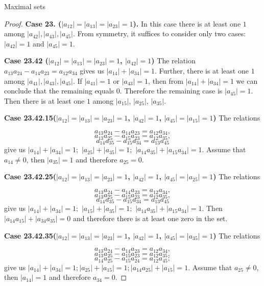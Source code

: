 \documentclass[12pt]{article}
\begin{document}
\begin{section}{Maximal sets}
\begin{proof}
        \textbf{Case 23. ($|a_{12}|=|a_{13}|=|a_{23}|=1$).} In this case there is at least one $1$ among $|a_{42}|, |a_{43}|,|a_{45}|$. From symmetry, it suffices to consider only two cases: $|a_{42}|=1$ and $|a_{45}|=1.$
    
        \textbf{Case 23.42 ($|a_{12}|=|a_{13}|=|a_{23}|=1$, $|a_{42}|=1$)} The relation  $a_{13}a_{24} - a_{14}a_{23} = a_{12}a_{34}$  gives us  $|a_{14}| + |a_{34}|=1.$ Further, there is at least one $1$ among $|a_{41}|,|a_{43}|, |a_{45}|$. If $|a_{41}|=1$ or $|a_{43}|=1$, then from $|a_{14}| + |a_{34}|=1$ we can conclude that the remaining equals $0$. Therefore the remaining case is $|a_{45}|=1.$ Then there is at least one $1$ among $|a_{15}|$, $|a_{25}|$, $|a_{35}|$.
    
         \textbf{Case 23.42.15($|a_{12}|=|a_{13}|=|a_{23}|=1$, $|a_{42}|=1$, $|a_{45}|=|a_{15}|=1$)} The relations 
         
         $$
            a_{13}a_{24} - a_{14}a_{23} = a_{12}a_{34},
         $$
           $$
            a_{13}a_{25} - a_{15}a_{23} = a_{12}a_{35},
         $$
         $$
            a_{14}a_{35} - a_{15}a_{34} = a_{13}a_{45}
         $$
         give us $|a_{14}| + |a_{34}| = 1;$ $|a_{25}| + |a_{35}| = 1;$ $|a_{14}a_{35}| + |a_{15}a_{34}| = 1$. Assume that $a_{14}\neq 0$, then $|a_{35}|=1$ and therefore $a_{25}=0.$
         
         
         \textbf{Case 23.42.25($|a_{12}|=|a_{13}|=|a_{23}|=1$, $|a_{42}|=1$, $|a_{45}|=|a_{25}|=1$)} The relations 
         
         $$
            a_{13}a_{24} - a_{14}a_{23} = a_{12}a_{34},
         $$
           $$
            a_{13}a_{25} - a_{15}a_{23} = a_{12}a_{35},
         $$
         $$
            a_{14}a_{35} - a_{15}a_{34} = a_{13}a_{45}
         $$
         give us $|a_{14}| + |a_{34}| = 1;$ $|a_{15}| + |a_{35}| = 1;$ $|a_{14}a_{35}| + |a_{15}a_{34}| = 1$. Then $|a_{14}a_{15}| + |a_{34}a_{35}|=0$ and therefore there is at least one zero in the set.
         
         \textbf{Case 23.42.35($|a_{12}|=|a_{13}|=|a_{23}|=1$, $|a_{42}|=1$, $|a_{45}|=|a_{35}|=1$)} 
     The relations 
         
         $$
            a_{13}a_{24} - a_{14}a_{23} = a_{12}a_{34},
         $$
           $$
            a_{13}a_{25} - a_{15}a_{23} = a_{12}a_{35},
         $$
       $$
            a_{14}a_{25} - a_{15}a_{24} = a_{12}a_{45};
        $$
         give us $|a_{14}|+|a_{34}|=1; |a_{25}| + |a_{15}|=1; |a_{14}a_{25}| + |a_{15}|=1.$ Assume that $a_{25}\neq 0$, then $|a_{14}|=1$ and therefore $a_{34}=0.$ 
    

\end{proof}
\end{section}
\end{document}
